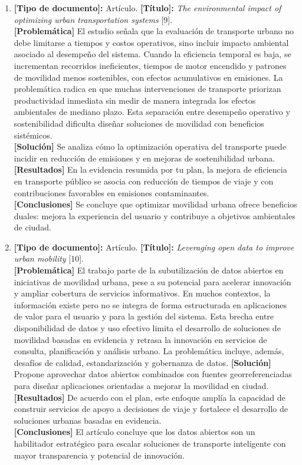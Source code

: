 \begin{enumerate}
    \item \textbf{[Tipo de documento]:} Artículo. \textbf{[Título]:} \textit{The environmental impact of optimizing urban transportation systems} [9].\\
    \textbf{[Problemática]} El estudio se\~{n}ala que la evaluaci\'{o}n de transporte urbano no debe limitarse a tiempos y costos operativos, sino incluir impacto ambiental asociado al desempeño del sistema. Cuando la eficiencia temporal es baja, se incrementan recorridos ineficientes, tiempos de motor encendido y patrones de movilidad menos sostenibles, con efectos acumulativos en emisiones. La problem\'{a}tica radica en que muchas intervenciones de transporte priorizan productividad inmediata sin medir de manera integrada los efectos ambientales de mediano plazo. Esta separaci\'{o}n entre desempe\~{n}o operativo y sostenibilidad dificulta dise\~{n}ar soluciones de movilidad con beneficios sist\'{e}micos.\\
    \textbf{[Solución]} Se analiza cómo la optimización operativa del transporte puede incidir en reducción de emisiones y en mejoras de sostenibilidad urbana.\\
    \textbf{[Resultados]} En la evidencia resumida por tu plan, la mejora de eficiencia en transporte público se asocia con reducción de tiempos de viaje y con contribuciones favorables en emisiones contaminantes.\\
    \textbf{[Conclusiones]} Se concluye que optimizar movilidad urbana ofrece beneficios duales: mejora la experiencia del usuario y contribuye a objetivos ambientales de ciudad.

    \item \textbf{[Tipo de documento]:} Artículo. \textbf{[Título]:} \textit{Leveraging open data to improve urban mobility} [10].\\
    \textbf{[Problemática]} El trabajo parte de la subutilizaci\'{o}n de datos abiertos en iniciativas de movilidad urbana, pese a su potencial para acelerar innovaci\'{o}n y ampliar cobertura de servicios informativos. En muchos contextos, la informaci\'{o}n existe pero no se integra de forma estructurada en aplicaciones de valor para el usuario y para la gesti\'{o}n del sistema. Esta brecha entre disponibilidad de datos y uso efectivo limita el desarrollo de soluciones de movilidad basadas en evidencia y retrasa la innovaci\'{o}n en servicios de consulta, planificaci\'{o}n y an\'{a}lisis urbano. La problem\'{a}tica incluye, adem\'{a}s, desaf\'{i}os de calidad, estandarizaci\'{o}n y gobernanza de datos.
    \textbf{[Solución]} Propone aprovechar datos abiertos combinados con fuentes georreferenciadas para diseñar aplicaciones orientadas a mejorar la movilidad en ciudad.\\
    \textbf{[Resultados]} De acuerdo con el plan, este enfoque amplía la capacidad de construir servicios de apoyo a decisiones de viaje y fortalece el desarrollo de soluciones urbanas basadas en evidencia.\\
    \textbf{[Conclusiones]} El artículo concluye que los datos abiertos son un habilitador estratégico para escalar soluciones de transporte inteligente con mayor transparencia y potencial de innovación.
\end{enumerate}

